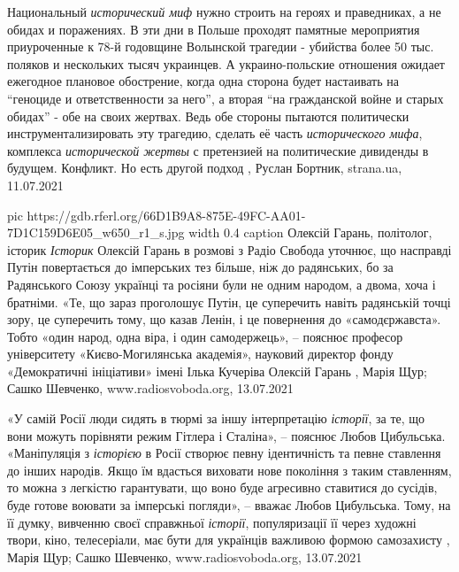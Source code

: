 Национальный \emph{исторический миф} нужно строить на героях и праведниках, а не
обидах и поражениях.  В эти дни в Польше проходят памятные мероприятия
приуроченные к 78-й годовщине Волынской трагедии - убийства более 50 тыс.
поляков и нескольких тысяч украинцев.  А украино-польские отношения ожидает
ежегодное плановое обострение, когда одна сторона будет настаивать на \enquote{геноциде
и ответственности за него}, а вторая \enquote{на гражданской войне и старых обидах} -
обе на своих жертвах.  Ведь обе стороны пытаются политически
инструментализировать эту трагедию, сделать её часть \emph{исторического мифа},
комплекса \emph{исторической жертвы} с претензией на политические дивиденды в будущем.
Конфликт.  Но есть другой подход
, Руслан Бортник, strana.ua, 11.07.2021

\ifcmt
  pic https://gdb.rferl.org/66D1B9A8-875E-49FC-AA01-7D1C159D6E05_w650_r1_s.jpg
  width 0.4
	caption Олексій Гарань, політолог, історик
\fi
\emph{Історик} Олексій Гарань в розмові з Радіо Свобода уточнює, що насправді Путін
повертається до імперських тез більше, ніж до радянських, бо за Радянського
Союзу українці та росіяни були не одним народом, а двома, хоча і братніми.
«Те, що зараз проголошує Путін, це суперечить навіть радянській точці зору, це
суперечить тому, що казав Ленін, і це повернення до «самодєржавста». Тобто
«один народ, одна віра, і один самодержець», – пояснює професор університету
«Києво-Могилянська академія», науковий директор фонду «Демократичні ініціативи»
імені Ілька Кучеріва Олексій Гарань
, 
Марія Щур; Сашко Шевченко, www.radiosvoboda.org, 13.07.2021

«У самій Росії люди сидять в тюрмі за іншу інтерпретацію \emph{історії}, за те, що
вони можуть порівняти режим Гітлера і Сталіна», – пояснює Любов Цибульська.
«Маніпуляція з \emph{історією} в Росії створює певну ідентичність та певне ставлення
до інших народів. Якщо їм вдасться виховати нове покоління з таким ставленням,
то можна з легкістю гарантувати, що воно буде агресивно ставитися до сусідів,
буде готове воювати за імперські погляди», – вважає Любов Цибульська.
Тому, на її думку, вивченню своєї справжньої \emph{історії}, популяризації її через
художні твори, кіно, телесеріали, має бути для українців важливою формою
самозахисту
, 
Марія Щур; Сашко Шевченко, www.radiosvoboda.org, 13.07.2021

